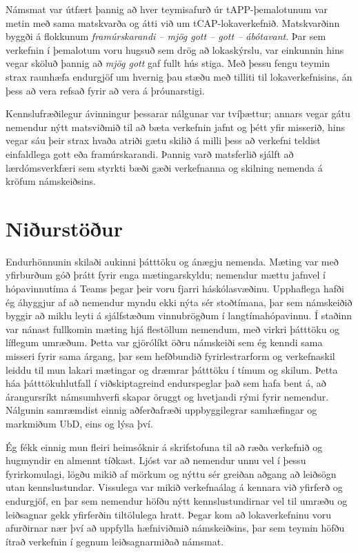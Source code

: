 \documentclass{article}
\begin{document}
Námsmat var útfært þannig að hver teymisafurð úr tAPP-þemalotunum var metin með sama matskvarða og átti við um tCAP-lokaverkefnið. Matskvarðinn byggði á flokkunum \emph{framúrskarandi -- mjög gott -- gott -- ábótavant}. Þar sem verkefnin í þemalotum voru hugsuð sem drög að lokaskýrslu, var einkunnin hins vegar sköluð þannig að \emph{mjög gott} gaf fullt hús stiga. Með þessu fengu teymin strax raunhæfa endurgjöf um hvernig þau stæðu með tilliti til lokaverkefnisins, án þess að vera refsað fyrir að vera á þróunarstigi.

Kennslufræðilegur ávinningur þessarar nálgunar var tvíþættur; annars vegar gátu nemendur nýtt matsviðmið til að bæta verkefnin jafnt og þétt yfir misserið, hins vegar sáu þeir strax hvaða atriði gætu skilið á milli þess að verkefni teldist einfaldlega gott eða framúrskarandi. Þannig varð matsferlið sjálft að lærdómsverkfæri sem styrkti bæði gæði verkefnanna og skilning nemenda á kröfum námskeiðsins.

\section*{Niðurstöður}
Endurhönnunin skilaði aukinni þátttöku og ánægju nemenda. Mæting var með yfirburðum góð þrátt fyrir enga mætingarskyldu; nemendur mættu jafnvel í hópavinnutíma á Teams þegar þeir voru fjarri háskólasvæðinu. Upphaflega hafði ég áhyggjur af að nemendur myndu ekki nýta sér stoðtímana, þar sem námskeiðið byggir að miklu leyti á sjálfstæðum vinnubrögðum í langtímahópavinnu. Í staðinn var nánast fullkomin mæting hjá flestöllum nemendum, með virkri þátttöku og líflegum umræðum. Þetta var gjörólíkt öðru námskeiði sem ég kenndi sama misseri fyrir sama árgang, þar sem hefðbundið fyrirlestrarform og verkefnaskil leiddu til mun lakari mætingar og dræmrar þátttöku í tímum og skilum.
Þetta háa þátttökuhlutfall í viðskiptagreind endurspeglar það sem \cite{freeman2007sense} hafa bent á, að árangursríkt námsumhverfi skapar öruggt og hvetjandi rými fyrir nemendur. Nálgunin samræmdist einnig aðferðafræði uppbyggilegrar samhæfingar og markmiðum UbD, eins og \cite{biggs_constructive, biggs_university} lýsa því.

Ég fékk einnig mun fleiri heimsóknir á skrifstofuna til að ræða verkefnið og hugmyndir en almennt tíðkast. Ljóst var að nemendur unnu vel í þessu fyrirkomulagi, lögðu mikið af mörkum og nýttu sér greiðan aðgang að leiðsögn utan kennslustundar. Vissulega var mikið verkefnaálag á kennara við yfirferð og endurgjöf, en þar sem nemendur höfðu nýtt kennslustundirnar vel til umræðu og leiðsagnar gekk yfirferðin tiltölulega hratt. Þegar kom að lokaverkefninu voru afurðirnar nær því að uppfylla hæfniviðmið námskeiðsins, þar sem teymin höfðu ítrað verkefnin í gegnum leiðsagnarmiðað námsmat.
\end{document}
